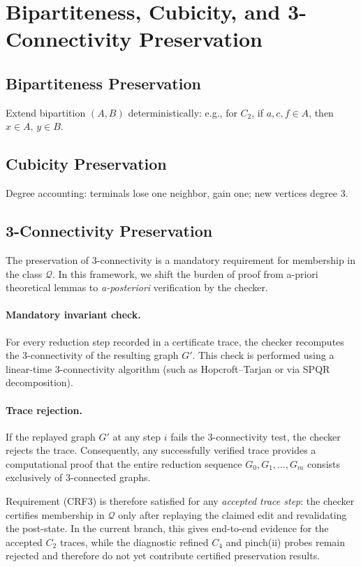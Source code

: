 \documentclass[12pt]{article}
\theoremstyle{definition}
\begin{document}
\section{Bipartiteness, Cubicity, and 3-Connectivity Preservation}
\label{sec:other-preservation}

\subsection{Bipartiteness Preservation}
\label{subsec:bipartiteness}
Extend bipartition $(A,B)$ deterministically: e.g., for $C_2$, if $a,c,f \in A$, then $x \in A$, $y \in B$.

\subsection{Cubicity Preservation}
\label{subsec:cubicity}
Degree accounting: terminals lose one neighbor, gain one; new vertices degree 3.

\subsection{3-Connectivity Preservation}
\label{subsec:3conn-preservation}

The preservation of 3-connectivity is a mandatory requirement for membership in the class $\mathcal{Q}$. In this framework, we shift the burden of proof from a-priori theoretical lemmas to \emph{a-posteriori} verification by the checker.

\paragraph{Mandatory invariant check.}
For every reduction step recorded in a certificate trace, the checker recomputes the 3-connectivity of the resulting graph $G'$. This check is performed using a linear-time 3-connectivity algorithm (such as Hopcroft--Tarjan or via SPQR decomposition).

\paragraph{Trace rejection.}
If the replayed graph $G'$ at any step $i$ fails the 3-connectivity test, the checker rejects the trace. Consequently, any successfully verified trace provides a computational proof that the entire reduction sequence $G_0, G_1, \dots, G_m$ consists exclusively of 3-connected graphs.

\bigskip
Requirement (CRF3) is therefore satisfied for any \emph{accepted trace step}: the checker certifies membership in $\mathcal{Q}$ only after replaying the claimed edit and revalidating the post-state. In the current branch, this gives end-to-end evidence for the accepted $C_2$ traces, while the diagnostic refined $C_4$ and pinch(ii) probes remain rejected and therefore do not yet contribute certified preservation results.
\end{document}

